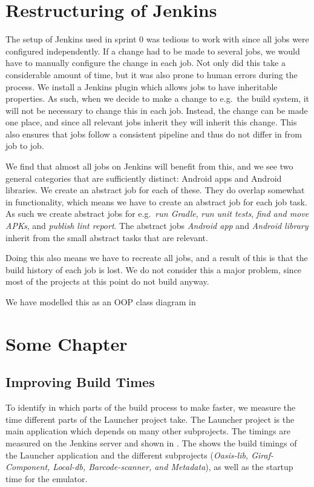 



\chapter{Restructuring of Jenkins}
The setup of Jenkins used in sprint 0 was tedious to work with since all jobs were configured independently. If a change had to be made to several jobs, we would have to manually configure the change in each job. Not only did this take a considerable amount of time, but it was also prone to human errors during the process. We install a Jenkins plugin which allows jobs to have inheritable properties. As such, when we decide to make a change to e.g.\ the build system, it will not be necessary to change this in each job. Instead, the change can be made one place, and since all relevant jobs inherit they will inherit this change. This also ensures that jobs follow a consistent pipeline and thus do not differ in from job to job.

We find that almost all jobs on Jenkins will benefit from this, and we see two general categories that are sufficiently distinct: Android apps and Android libraries. We create an abstract job for each of these. They do overlap somewhat in functionality, which means we have to create an abstract job for each job task. As such we create abstract jobs for e.g.\ \emph{run Gradle}, \emph{run unit tests}, \emph{find and move APKs}, and \emph{publish lint report}. The abstract jobs \emph{Android app} and \emph{Android library} inherit from the small abstract tasks that are relevant.

Doing this also means we have to recreate all jobs, and a result of this is that the build history of each job is lost. We do not consider this a major problem, since most of the projects at this point do not build anyway.

We have modelled this as an OOP class diagram in 

\chapter{Some Chapter}
\section{Improving Build Times}

To identify in which parts of the build process to make faster, we measure the time different parts of the Launcher project take. The Launcher project is the main application which depends on many other subprojects. The timings are measured on the Jenkins server and shown in . The shows the build timings of the Launcher application and the different subprojects (\emph{Oasis-lib, Giraf-Component, Local-db, Barcode-scanner, and Metadata}), as well as the startup time for the emulator.

